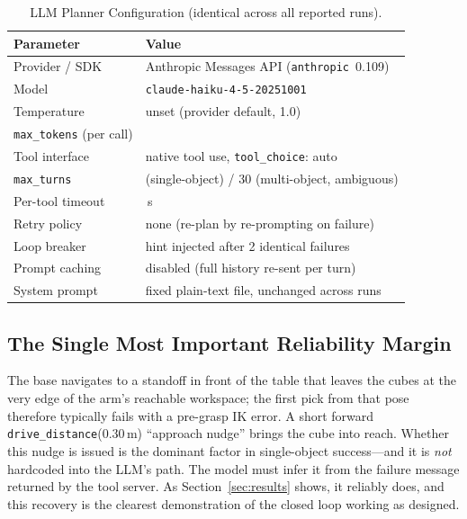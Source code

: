 \documentclass[conference]{IEEEtran}
\begin{document}
\begin{table}[t]
\caption{LLM Planner Configuration (identical across all reported runs).}
\label{tab:llmconfig}
\centering
\footnotesize
\setlength{\tabcolsep}{3pt}
\begin{tabular}{@{}>{\raggedright\arraybackslash}p{2.7cm}>{\raggedright\arraybackslash}p{4.9cm}@{}}
\toprule
\textbf{Parameter} & \textbf{Value} \\
\midrule
Provider / SDK & Anthropic Messages API (\texttt{anthropic}~0.109) \\
Model & \texttt{claude-haiku-4-5-}\allowbreak\texttt{20251001} \\
Temperature & unset (provider default, 1.0) \\
\texttt{max\_tokens} (per call) & 1024 \\
Tool interface & native tool use, \texttt{tool\_choice}: auto \\
\texttt{max\_turns} & 25 (single-object) / 30 (multi-object, ambiguous) \\
Per-tool timeout & 200\,s \\
Retry policy & none (re-plan by re-prompting on failure) \\
Loop breaker & hint injected after 2 identical failures \\
Prompt caching & disabled (full history re-sent per turn) \\
System prompt & fixed plain-text file, unchanged across runs \\
\bottomrule
\end{tabular}
\end{table}

\subsection{The Single Most Important Reliability Margin}
\label{sec:margin}

The base navigates to a standoff in front of the table that leaves the
cubes at the very edge of the arm's reachable workspace; the first pick
from that pose therefore typically fails with a pre-grasp IK error. A short
forward \texttt{drive\_distance}(0.30\,m) ``approach nudge'' brings the
cube into reach. Whether this nudge is issued is the dominant factor in
single-object success---and it is \emph{not} hardcoded into the LLM's
path. The model must infer it from the failure message returned by the
tool server. As Section~\ref{sec:results} shows, it reliably does, and
this recovery is the clearest demonstration of the closed loop working as
designed.
\end{document}
